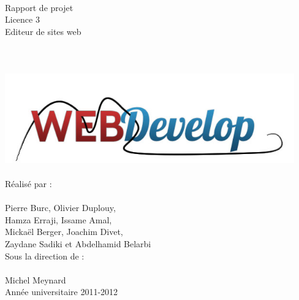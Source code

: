 \documentclass[a4paper, 12pt]{report}
\begin{document}
	\begin{titlepage}
		\\ 
		~\\
		~\\
		~\\
		~\\
		~\\		
		\begin{center}
			{\large Rapport de projet} \\
			{\large Licence 3}\\
			\vspace{1,5cm}
			{\Huge Editeur de sites web}\\
			~\\
			~\\
			~\\
			\includegraphics[width=12.5cm]{images/logoTest1.png}
			~\\
			~\\
			{\large Réalisé par :} \\
			~\\
			{\LARGE Pierre Burc, Olivier Duplouy, \\
				      Hamza Erraji, Issame Amal,\\
				      Mickaël Berger, Joachim Divet,\\
				      Zaydane Sadiki et Abdelhamid Belarbi}\\
			\vspace{1,5cm}
			{\large Sous la direction de :} \\
			~\\
			{\LARGE Michel Meynard} \\
			\vspace{2.5cm}
			{\large Année universitaire 2011-2012 }			
		\end{center}
	\end{titlepage}
\end{document}
